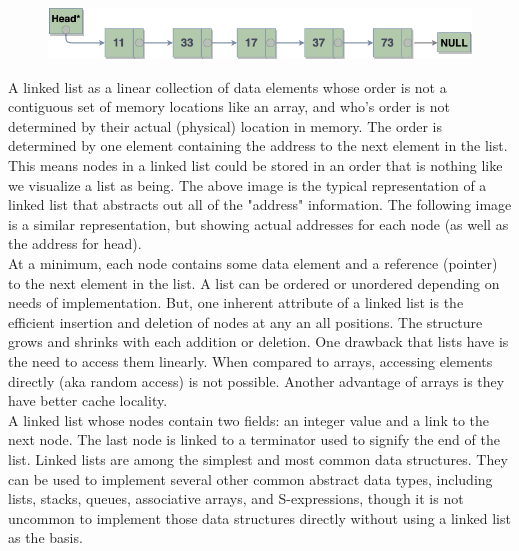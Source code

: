 \newpage
{}

\begin{figure}[h]
 \centering
\includegraphics[scale=.40]{images/singly_linked_list.png}
\end{figure}


A linked list as a linear collection of data elements whose order is not a contiguous set of memory locations like an array, and who's order is not determined by their actual (physical) location in memory. The order is determined by one element containing the address to the next element in the list. This means nodes in a linked list could be stored in an order that is nothing like we visualize a list as being. The above image is the typical representation of a linked list that abstracts out all of the "address" information. The following image is a similar representation, but showing actual addresses for each node (as well as the address for head).\\

At a minimum, each node contains some data element and a reference (pointer) to the next element in the list. A list can be ordered or unordered depending on needs of implementation. But, one inherent attribute of a linked list is the efficient insertion and deletion of nodes at any an all positions. The structure grows and shrinks with each addition or deletion. One drawback that lists have is the need to access them linearly. When compared to arrays, accessing elements directly (aka random access) is not possible. Another advantage of arrays is they have better cache locality. \\

A linked list whose nodes contain two fields: an integer value and a link to the next node. The last node is linked to a terminator used to signify the end of the list. Linked lists are among the simplest and most common data structures. They can be used to implement several other common abstract data types, including lists, stacks, queues, associative arrays, and S-expressions, though it is not uncommon to implement those data structures directly without using a linked list as the basis.\\

